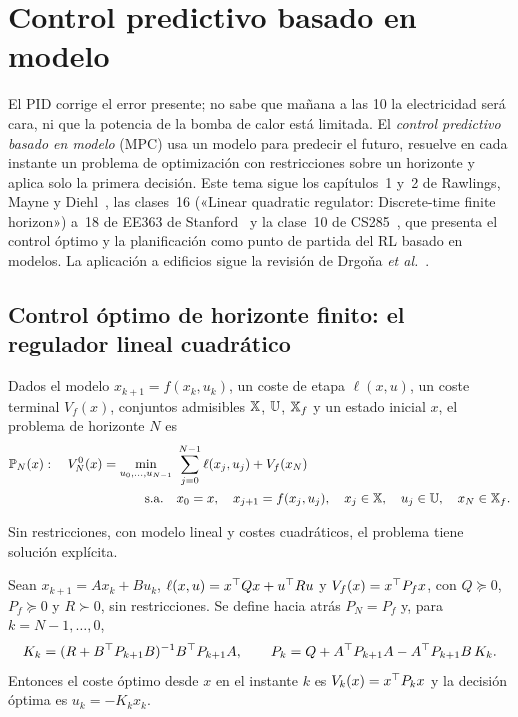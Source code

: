 \chapter{Control predictivo basado en modelo}
\label{tema:3}

El PID corrige el error presente; no sabe que mañana a las 10 la electricidad será cara, ni que la potencia de la bomba de calor está limitada. El \emph{control predictivo basado en modelo} (MPC) usa un modelo para predecir el futuro, resuelve en cada instante un problema de optimización con restricciones sobre un horizonte y aplica solo la primera decisión. Este tema sigue los capítulos~1 y~2 de Rawlings, Mayne y Diehl~\cite{rmd}, las clases~16 («Linear quadratic regulator: Discrete-time finite horizon») a~18 de EE363 de Stanford~\cite{ee363} y la clase~10 de CS285~\cite{cs285}, que presenta el control óptimo y la planificación como punto de partida del RL basado en modelos. La aplicación a edificios sigue la revisión de Drgoňa \emph{et al.}~\cite{drgona}.

\section{Control óptimo de horizonte finito: el regulador lineal cuadrático}

\begin{definicion}\label{def:ocp}
Dados el modelo $x_{k+1}=f(x_k,u_k)$, un coste de etapa $\ell(x,u)$, un coste terminal $V_f(x)$, conjuntos admisibles $\mathbb{X}$, $\mathbb{U}$, $\mathbb{X}_f$ y un estado inicial $x$, el problema de horizonte $N$ es
\[
\begin{aligned}
\mathbb P_N(x):\quad V_N^{0}(x)=\min_{u_0,\dots,u_{N-1}}\ &\sum_{j=0}^{N-1}\ell(x_j,u_j)+V_f(x_N)\\
\text{s.a.}\quad &x_0=x,\quad x_{j+1}=f(x_j,u_j),\quad x_j\in\Xset,\quad u_j\in\Uset,\quad x_N\in\Xset_f .
\end{aligned}
\]
\end{definicion}

Sin restricciones, con modelo lineal y costes cuadráticos, el problema tiene solución explícita.

\begin{teorema}\label{teo:lqr}
Sean $x_{k+1}=Ax_k+Bu_k$, $\ell(x,u)=x^{\top} Qx+u^{\top} Ru$ y $V_f(x)=x^{\top} P_fx$, con $Q\succeq0$, $P_f\succeq0$ y $R\succ0$, sin restricciones. Se define hacia atrás $P_N=P_f$ y, para $k=N-1,\dots,0$,
\[
K_k=(R+B^{\top} P_{k+1}B)^{-1}B^{\top} P_{k+1}A,\qquad P_k=Q+A^{\top} P_{k+1}A-A^{\top} P_{k+1}B\,K_k .
\]
Entonces el coste óptimo desde $x$ en el instante $k$ es $V_k(x)=x^{\top} P_kx$ y la decisión óptima es $u_k=-K_kx_k$.
\end{teorema}

